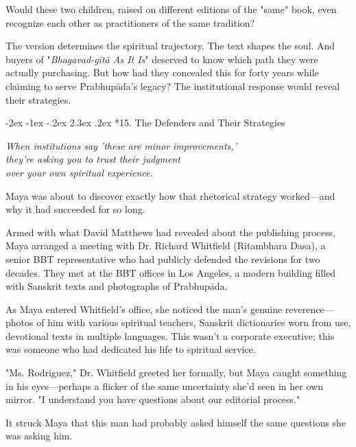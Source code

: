 \documentclass[12pt,twoside]{book}
\makeatletter
\renewcommand\section{\@startsection{section}{1}{\z@}%
{-3.5ex \@plus -1ex \@minus -.2ex}%
{2.3ex \@plus.2ex}%
{\normalfont\Large\bfseries}}
\let\oldsection\section
\renewcommand{\section}[1]{\needspace{4\baselineskip}\oldsection{#1}}
\def\cleardoublepage{\clearpage\if@twoside \ifodd\c@page\else\hbox{}\thispagestyle{empty}\newpage\if@twocolumn\hbox{}\newpage\fi\fi\fi}
\renewcommand\section{\@startsection{section}{1}{\z@}%
{-2ex \@plus -1ex \@minus -.2ex}%
{2.3ex \@plus.2ex}%
{\normalfont\Large\bfseries}}
\makeatother
\begin{document}
Would these two children, raised on different editions of the "same" book, even recognize each other as practitioners of the same tradition?

The version determines the spiritual trajectory. The text shapes the soul. And buyers of "\emph{Bhagavad-gītā As It Is}" deserved to know which path they were actually purchasing. But how had they concealed this for forty years while claiming to serve Prabhupāda's legacy? The institutional response would reveal their strategies.

\cleardoublepage
\vspace*{0.20\textheight}
\section*{15. The Defenders and Their Strategies}
\thispagestyle{chapterpage}

{\centering\itshape When institutions say 'these are minor improvements,'\\they're asking you to trust their judgment\\over your own spiritual experience.\par}
\vspace{0.1cm}

\normalfont\justifying
Maya was about to discover exactly how that rhetorical strategy worked—and why it had succeeded for so long.

Armed with what David Matthews had revealed about the publishing process, Maya arranged a meeting with Dr. Richard Whitfield (Ritambhara Dasa), a senior BBT representative who had publicly defended the revisions for two decades. They met at the BBT offices in Los Angeles, a modern building filled with Sanskrit texts and photographs of Prabhupāda.

As Maya entered Whitfield's office, she noticed the man's genuine reverence—photos of him with various spiritual teachers, Sanskrit dictionaries worn from use, devotional texts in multiple languages. This wasn't a corporate executive; this was someone who had dedicated his life to spiritual service.

"Ms. Rodriguez," Dr. Whitfield greeted her formally, but Maya caught something in his eyes—perhaps a flicker of the same uncertainty she'd seen in her own mirror. "I understand you have questions about our editorial process."

It struck Maya that this man had probably asked himself the same questions she was asking him.
\end{document}
